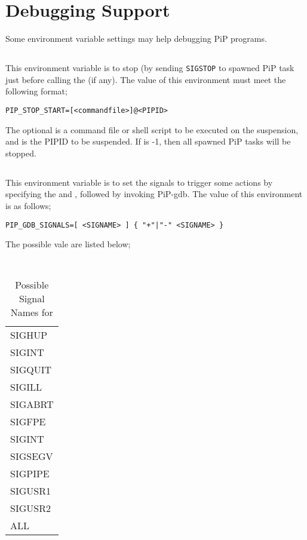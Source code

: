 
\section{Debugging Support}

Some environment variable settings may help debugging PiP programs.

\subsection{}

This environment variable is to stop (by sending {\tt SIGSTOP} to
spawned PiP task just before calling the  (if
any). The value of this environment must meet the following format;

\begin{lstlisting}[frame=tb]
  PIP_STOP_START=[<commandfile>]@<PIPID>
\end{lstlisting}

The optional {\tt{}} is a command file or shell
script to be executed on the suspension, and {\tt{}} is the
PIPID to be suspended. If {\tt{}} is -1, then all spawned PiP
tasks will be stopped. 

\subsection{}

This environment variable is to set the signals to trigger some
actions by specifying the  and 
, followed by invoking PiP-gdb. The value of
this environment is as follows;

\begin{lstlisting}[frame=tb]
  PIP_GDB_SIGNALS=[ <SIGNAME> ] { "+"|"-" <SIGNAME> }
\end{lstlisting}

The possible {\tt{}} vale are listed below;

\begin{table}[ht]
  \centering
  \caption{Possible Signal Names for }
  \vspace{3mm}
  \tt
  \begin{tabular}{l}
    SIGHUP \\
    SIGINT \\
    SIGQUIT \\
    SIGILL \\
    SIGABRT \\
    SIGFPE \\
    SIGINT \\
    SIGSEGV \\
    SIGPIPE \\
    SIGUSR1 \\
    SIGUSR2 \\
    ALL \\
  \end{tabular}
\end{table}

